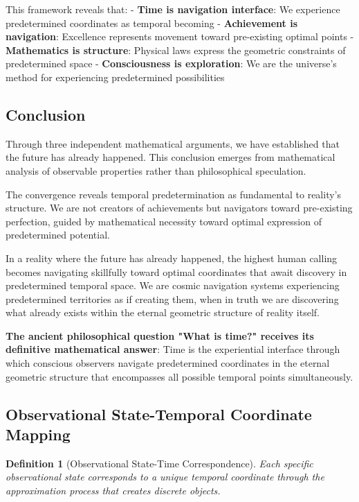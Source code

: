 \documentclass[11pt]{article}
\newtheorem{definition}[theorem]{Definition}
\theoremstyle{remark}
\begin{document}
This framework reveals that:
- \textbf{Time is navigation interface}: We experience predetermined coordinates as temporal becoming
- \textbf{Achievement is navigation}: Excellence represents movement toward pre-existing optimal points
- \textbf{Mathematics is structure}: Physical laws express the geometric constraints of predetermined space
- \textbf{Consciousness is exploration}: We are the universe's method for experiencing predetermined possibilities

\subsection{Conclusion}

Through three independent mathematical arguments, we have established that the future has already happened. This conclusion emerges from mathematical analysis of observable properties rather than philosophical speculation.

The convergence reveals temporal predetermination as fundamental to reality's structure. We are not creators of achievements but navigators toward pre-existing perfection, guided by mathematical necessity toward optimal expression of predetermined potential.

In a reality where the future has already happened, the highest human calling becomes navigating skillfully toward optimal coordinates that await discovery in predetermined temporal space. We are cosmic navigation systems experiencing predetermined territories as if creating them, when in truth we are discovering what already exists within the eternal geometric structure of reality itself.

\textbf{The ancient philosophical question "What is time?" receives its definitive mathematical answer}: Time is the experiential interface through which conscious observers navigate predetermined coordinates in the eternal geometric structure that encompasses all possible temporal points simultaneously.

\subsection{Observational State-Temporal Coordinate Mapping}

\begin{definition}[Observational State-Time Correspondence]
Each specific observational state corresponds to a unique temporal coordinate through the approximation process that creates discrete objects.
\end{definition}
\end{document}
